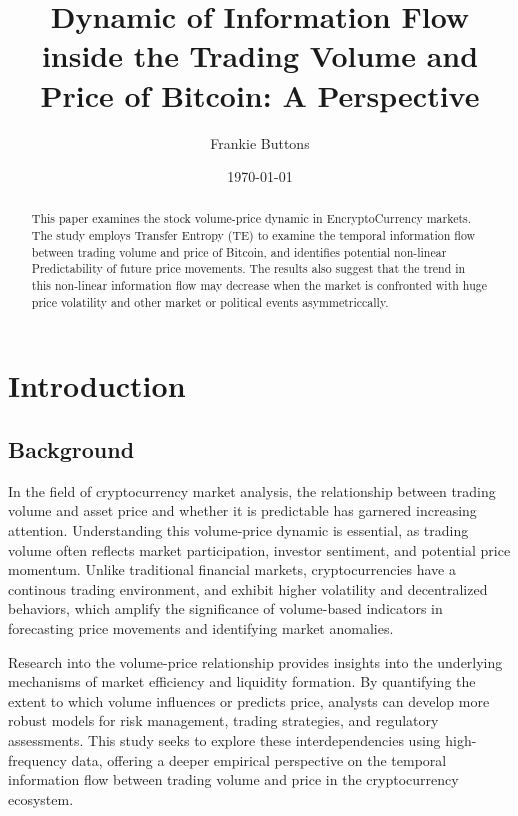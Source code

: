 \documentclass{article}
\begin{document}
\title{Dynamic of Information Flow inside the Trading Volume and Price of Bitcoin: A Perspective}
\author{Frankie Buttons}
\date{\today}
\maketitle

\begin{abstract}
    This paper examines the stock volume-price dynamic in EncryptoCurrency markets. The study employs Transfer Entropy (TE) to examine the temporal information flow between trading volume and price of Bitcoin, and identifies potential non-linear Predictability of future price movements. The results also suggest that the trend in this non-linear information flow may decrease when the market is confronted with huge price volatility and other market or political events asymmetriccally.
\end{abstract}

\section{Introduction}
\subsection{Background}
In the field of cryptocurrency market analysis, the relationship between trading volume and asset price and whether it is predictable has garnered increasing attention. Understanding this volume-price dynamic is essential, as trading volume often reflects market participation, investor sentiment, and potential price momentum. Unlike traditional financial markets, cryptocurrencies have a continous trading environment, and exhibit higher volatility and decentralized behaviors, which amplify the significance of volume-based indicators in forecasting price movements and identifying market anomalies.

Research into the volume-price relationship provides insights into the underlying mechanisms of market efficiency and liquidity formation. By quantifying the extent to which volume influences or predicts price, analysts can develop more robust models for risk management, trading strategies, and regulatory assessments. This study seeks to explore these interdependencies using high-frequency data, offering a deeper empirical perspective on the temporal information flow between trading volume and price in the cryptocurrency ecosystem.
\end{document}
